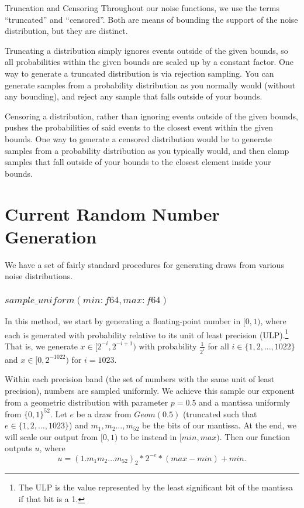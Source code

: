 \documentclass[11pt]{scrartcl} %
\begin{document}
\begin{definition}
	\label{def:truncation_censoring}
	Truncation and Censoring \newline
	Throughout our noise functions, we use the terms ``truncated'' and ``censored''.
	Both are means of bounding the support of the noise distribution, but they are distinct. \newline

	Truncating a distribution simply ignores events outside of the given bounds, so
	all probabilities within the given bounds are scaled up by a constant factor.
	One way to generate a truncated distribution is via rejection sampling.
	You can generate samples from a probability distribution as you normally would (without any bounding),
	and reject any sample that falls outside of your bounds. \newline

	Censoring a distribution, rather than ignoring events outside of the given bounds, pushes the
	probabilities of said events to the closest event within the given bounds. One way to generate
	a censored distribution would be to generate samples from a probability distribution as you
	typically would, and then clamp samples that fall outside of your bounds to the closest element
	inside your bounds.
\end{definition}

\section{Current Random Number Generation}
We have a set of fairly standard procedures for generating draws from various noise distributions.


\subsubsection{$sample\_uniform(min: f64, max: f64)$}
In this method, we start by generating a floating-point number in $[0,1)$,
where each is generated with probability relative to its unit of least precision (ULP).\footnote{The ULP is the value
represented by the least significant bit of the mantissa if that bit is a 1.}
That is, we generate $x \in [2^{-i}, 2^{-i+1})$ with probability $\frac{1}{2^i}$
for all $i \in \{1,2,\hdots,1022\}$ and $x \in [0, 2^{-1022})$ for $i = 1023$.

Within each precision band (the set of numbers with the same unit
of least precision), numbers are sampled uniformly.
We achieve this sample our exponent from a geometric distribution with parameter $p = 0.5$ and a mantissa uniformly from $\{0,1\}^{52}$.
Let $e$ be a draw from $Geom(0.5)$ (truncated such that $e \in \{1,2,\hdots,1023\}$) and $m_1, m_2 \hdots, m_{52}$ be the bits of our mantissa.
At the end, we will scale our output from $[0,1)$ to be instead in $[min, max)$. Then our function outputs $u$, where
\[ u = (1.m_1m_2 \hdots m_{52})_2 * 2^{-e} * (max - min) + min. \]
\end{document}
